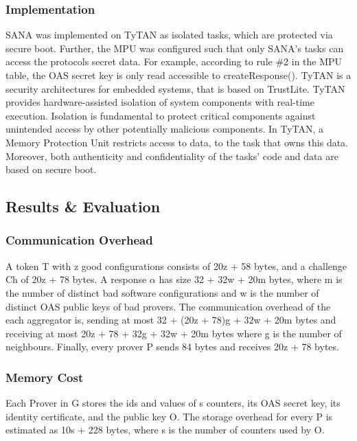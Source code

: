 \documentclass{article}
\begin{document}
\subsubsection{Implementation}

SANA was implemented on TyTAN as isolated tasks, which are protected via secure boot. Further, the MPU was configured such that only SANA’s tasks can access the protocols secret data. For example, according to rule \#2 in the MPU table, the OAS secret key is only read accessible to createResponse(). TyTAN is a security architectures for embedded systems, that is based on TrustLite. TyTAN provides hardware-assisted isolation of system components with real-time execution. Isolation is fundamental to protect critical components against unintended access by other potentially malicious components. In TyTAN, a Memory Protection Unit restricts access to data, to the task that owns this data. Moreover, both authenticity and confidentiality of the tasks’ code and data are based on secure boot.

\subsection{Results \& Evaluation}

\subsubsection{Communication Overhead}

A token T with z good configurations consists of 20z + 58 bytes, and a challenge Ch of 20z + 78 bytes. A response $\alpha$ has size 32 + 32w + 20m bytes, where m is the number of distinct bad software configurations and w is the number of distinct OAS public keys of bad provers. The communication overhead of the each aggregator is, sending at most 32 + (20z + 78)g + 32w + 20m bytes and receiving at most 20z + 78 + 32g + 32w + 20m bytes where g is the number of neighbours. Finally, every prover P sends
84 bytes and receives 20z + 78 bytes.

\subsubsection{Memory Cost}

Each Prover in G stores the ids and values of s counters, its OAS secret key, its identity certificate, and the public key O. The storage overhead for every P is estimated as 10s + 228 bytes, where s is the number of counters used by O. 
\end{document}
